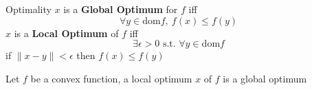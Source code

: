 \documentclass{article}
\begin{document}
\begin{definition}
    {Optimality}{}
    $x$ is a \textbf{Global Optimum} for $f$ iff 
    \[
        \forall y\in \mathrm{dom}f, \ f(x) \le f(y)
    \]
    $x$ is a \textbf{Local Optimum} of $f$ iff
    \[
        \exists \epsilon > 0 \text{ s.t. } \forall y\in \mathrm{dom}f
    \]
    if $\| x- y \| < \epsilon$ then $f(x) \le f(y)$
\end{definition}


\begin{thm}
    {}{}
    Let $f$ be a convex function, a local optimum $x$ of $f$ is a global optimum
\end{thm}
\end{document}
